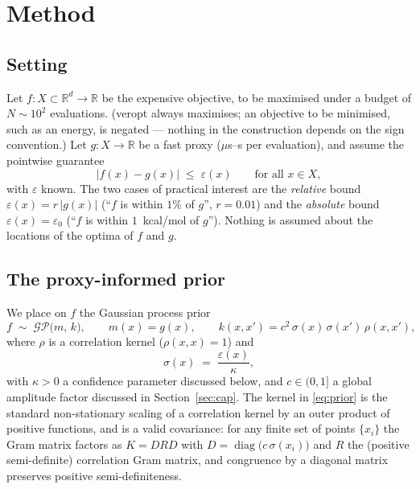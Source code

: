 \documentclass[11pt,a4paper]{article}
\newcommand{\veropt}{\textsf{veropt}}
\newcommand{\real}{\mathbb{R}}
\begin{document}
\section{Method}
\label{sec:method}

\subsection{Setting}

Let $f \colon X \subset \real^d \to \real$ be the expensive objective, to be
maximised under a budget of $N \sim 10^2$ evaluations. (\veropt{} always
maximises; an objective to be minimised, such as an energy, is negated ---
nothing in the construction depends on the sign convention.) Let
$g \colon X \to \real$ be a fast proxy ($\mu$s--s per evaluation), and assume
the pointwise guarantee
\begin{equation}
  \label{eq:bound}
  \lvert f(x) - g(x) \rvert \;\le\; \varepsilon(x)
  \qquad \text{for all } x \in X,
\end{equation}
with $\varepsilon$ known. The two cases of practical interest are the
\emph{relative} bound $\varepsilon(x) = r\,\lvert g(x)\rvert$ (``$f$ is within
$1\%$ of $g$'', $r = 0.01$) and the \emph{absolute} bound
$\varepsilon(x) = \varepsilon_0$ (``$f$ is within $1$~kcal/mol of $g$'').
Nothing is assumed about the locations of the optima of $f$ and $g$.

\subsection{The proxy-informed prior}

We place on $f$ the Gaussian process prior
\begin{equation}
  \label{eq:prior}
  f \;\sim\; \mathcal{GP}\bigl(m, \, k\bigr),
  \qquad
  m(x) = g(x),
  \qquad
  k(x, x') = c^2\, \sigma(x)\, \sigma(x')\, \rho(x, x'),
\end{equation}
where $\rho$ is a correlation kernel ($\rho(x,x) = 1$) and
\begin{equation}
  \label{eq:sigma}
  \sigma(x) \;=\; \frac{\varepsilon(x)}{\kappa},
\end{equation}
with $\kappa > 0$ a confidence parameter discussed below, and $c \in (0, 1]$
a global amplitude factor discussed in Section~\ref{sec:cap}. The kernel in
\eqref{eq:prior} is the standard non-stationary scaling of a correlation
kernel by an outer product of positive functions, and is a valid covariance:
for any finite set of points $\{x_i\}$ the Gram matrix factors as
$K = D R D$ with $D = \operatorname{diag}\bigl(c\,\sigma(x_i)\bigr)$ and $R$
the (positive semi-definite) correlation Gram matrix, and congruence by a
diagonal matrix preserves positive semi-definiteness.
\end{document}
